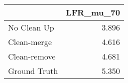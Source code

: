 \begin{tabular}{lr}
\toprule
{} & LFR_mu_70 \\
\midrule
No Clean Up  &     3.896 \\
Clean-merge  &     4.616 \\
Clean-remove &     4.681 \\
Ground Truth &     5.350 \\
\bottomrule
\end{tabular}
